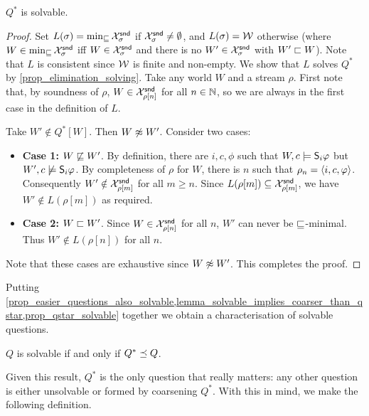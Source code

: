 \begin{proposition}
    \label{prop_qstar_solvable}
    $Q^*$ is solvable.
\end{proposition}

\begin{proof}
    Set $L(\sigma) = \min_{\specleq}{\Xsnd_\sigma}$ if $\Xsnd_\sigma \ne
    \emptyset$, and $L(\sigma) = \worlds$ otherwise (where $W \in
    \min_{\specleq}{\Xsnd_\sigma}$ iff $W \in \Xsnd_\sigma$ and there is no
    $W' \in \Xsnd_\sigma$ with $W' \speclt W$). Note that $L$ is consistent
    since $\worlds$ is finite and non-empty. We show that $L$ solves $Q^*$ by
    \cref{prop_elimination_solving}. Take any world $W$ and a stream $\rho$.
    First note that, by soundness of $\rho$, $W \in \Xsnd_{\rho[n]}$ for all $n
    \in \N$, so we are always in the first case in the definition of $L$.

    Take $W' \notin Q^*[W]$. Then $W \not\speceq W'$. Consider two cases:
    \begin{itemize}
        \item \textbf{Case 1:} $W \not\specleq W'$. By definition, there are
              $i, c, \phi$ such that $W, c \models \S_i\phi$ but $W', c
              \not\models \S_i\phi$. By completeness of $\rho$ for $W$, there
              is $n$ such that $\rho_n = \tuple{i, c, \phi}$. Consequently $W'
              \notin \Xsnd_{\rho[m]}$ for all $m \ge n$. Since $L(\rho[m])
              \subseteq \Xsnd_{\rho[m]}$, we have $W' \notin L(\rho[m])$ as
              required.

        \item \textbf{Case 2:} $W \speclt W'$. Since $W \in \Xsnd_{\rho[n]}$
              for all $n$, $W'$ can never be $\specleq$-minimal. Thus $W'
              \notin L(\rho[n])$ for all $n$.
    \end{itemize}
    Note that these cases are exhaustive since $W \not\speceq W'$. This
    completes the proof.
\end{proof}

Putting
\cref{prop_easier_questions_also_solvable,lemma_solvable_implies_coarser_than_qstar,prop_qstar_solvable}
together we obtain a characterisation of solvable questions.

\begin{theorem}
    \label{thm_solvability_characterisation}
    $Q$ is solvable if and only if $Q^* \refines Q$.
\end{theorem}

Given this result, $Q^*$ is the only question that really matters: any other
question is either unsolvable or formed by coarsening $Q^*$. With this in mind,
we make the following definition.

